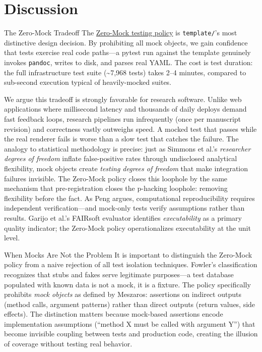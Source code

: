 \documentclass[
  ignorenonframetext,
]{beamer}
\author{\texorpdfstring{}{}}
\date{}
\begin{document}
\section{Discussion}\label{discussion}

\begin{frame}{The Zero-Mock Tradeoff}
\protect{}\label{the-zero-mock-tradeoff}
The \href{03e_quality.md\#zero-mock-testing-policy}{Zero-Mock testing
policy} is \texttt{template/}'s most distinctive design decision. By
prohibiting all mock objects, we gain confidence that tests exercise
real code paths---a pytest run against the template genuinely invokes
\texttt{pandoc}, writes to disk, and parses real YAML. The cost is test
duration: the full infrastructure test suite (\textasciitilde7,968
tests) takes 2--4 minutes, compared to sub-second execution typical of
heavily-mocked suites.

We argue this tradeoff is strongly favorable for research software.
Unlike web applications where millisecond latency and thousands of daily
deploys demand fast feedback loops, research pipelines run infrequently
(once per manuscript revision) and correctness vastly outweighs speed. A
mocked test that passes while the real renderer fails is worse than a
slow test that catches the failure. The analogy to statistical
methodology is precise: just as Simmons et al.'s \emph{researcher
degrees of freedom}  inflate
false-positive rates through undisclosed analytical flexibility, mock
objects create \emph{testing degrees of freedom} that make integration
failures invisible. The Zero-Mock policy closes this loophole by the
same mechanism that pre-registration 
closes the p-hacking loophole: removing flexibility before the fact. As
Peng  argues, computational reproducibility
requires independent verification---and mock-only tests verify
assumptions rather than results. Garijo et al.'s FAIRsoft evaluator
 identifies \emph{executability} as a primary
quality indicator; the Zero-Mock policy operationalizes executability at
the unit level.

\begin{block}{When Mocks Are Not the Problem}
\protect{}\label{when-mocks-are-not-the-problem}
It is important to distinguish the Zero-Mock policy from a naive
rejection of all test isolation techniques. Fowler's classification
 recognizes that stubs and fakes serve legitimate
purposes---a test database populated with known data is not a mock, it
is a fixture. The policy specifically prohibits \emph{mock objects} as
defined by Meszaros: assertions on indirect outputs (method calls,
argument patterns) rather than direct outputs (return values, side
effects). The distinction matters because mock-based assertions encode
implementation assumptions (``method X must be called with argument Y'')
that become invisible coupling between tests and production code,
creating the illusion of coverage without testing real behavior.
\end{block}


\end{frame}
\end{document}
